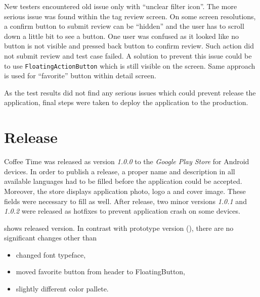 New testers encountered old issue only with ``unclear filter icon''. The more serious issue was found within the tag review screen. On some screen resolutions, a confirm button to submit review can be ``hidden'' and the user has to scroll down a little bit to see a button. One user was confused as it looked like no button is not visible and pressed back button to confirm review. Such action did not submit review and test case failed. A solution to prevent this issue could be to use \verb|FloatingActionButton| which is still visible on the screen. Same approach is used for ``favorite'' button within detail screen.

As the test results did not find any serious issues which could prevent release the application, final steps were taken to deploy the application to the production.

\section{Release}
Coffee Time was released as version \textit{1.0.0} to the \textit{Google Play Store} for Android devices. In order to publish a release, a proper name and description in all available languages had to be filled before the application could be accepted. Moreover, the store displays application photo, logo a and cover image. These fields were necessary to fill as well. After release, two minor versions \textit{1.0.1} and \textit{1.0.2} were released as hotfixes to prevent application crash on some devices.

 shows released version. In contrast with prototype version (), there are no significant changes other than 

\begin{itemize}
    \item changed font typeface,
    \item moved favorite button from header to FloatingButton,
    \item slightly different color pallete.
\end{itemize}

